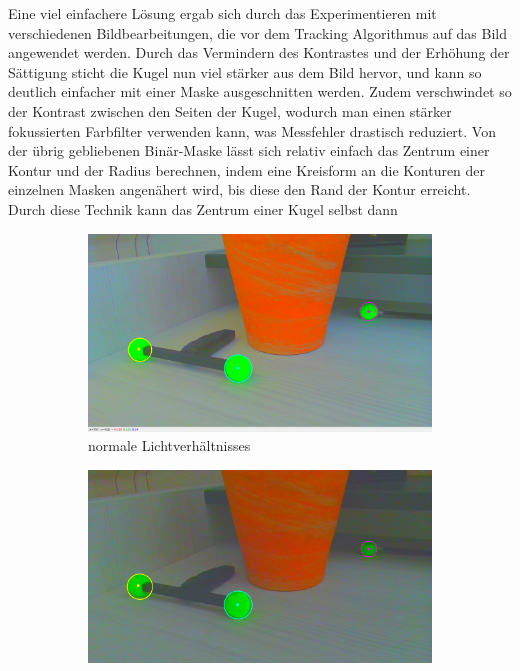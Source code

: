 \documentclass[12pt, ngerman]{article}
\begin{document}
Eine viel einfachere Lösung ergab sich durch das Experimentieren mit verschiedenen Bildbearbeitungen, die vor dem Tracking Algorithmus auf das Bild angewendet werden.  
Durch das Vermindern des Kontrastes und der Erhöhung der Sättigung sticht die Kugel nun viel stärker aus dem Bild hervor, und kann so deutlich einfacher mit einer Maske ausgeschnitten werden. Zudem verschwindet so der Kontrast zwischen den Seiten der Kugel, wodurch man einen stärker fokussierten Farbfilter verwenden kann, was Messfehler drastisch reduziert.  
Von der übrig gebliebenen Binär-Maske lässt sich relativ einfach das Zentrum einer Kontur und der Radius berechnen, indem eine Kreisform an die Konturen der einzelnen Masken angenähert wird, bis diese den Rand der Kontur erreicht. Durch diese Technik kann das Zentrum einer Kugel selbst dann
\begin{figure}[htbp!]
  \centering
  \begin{subfigure}[t]{0.45\textwidth}
      \centering
      \includegraphics[width=\textwidth]{2d-color.jpg}
      \caption{normale Lichtverhältnisses}
      \label{Abb: 2d-color-normal}
  \end{subfigure}
  \hfill
  \begin{subfigure}[t]{0.45\textwidth}
      \centering
      \includegraphics[width=\textwidth]{2d-color-dark.jpg}

\end{subfigure}
\end{figure}
\end{document}
